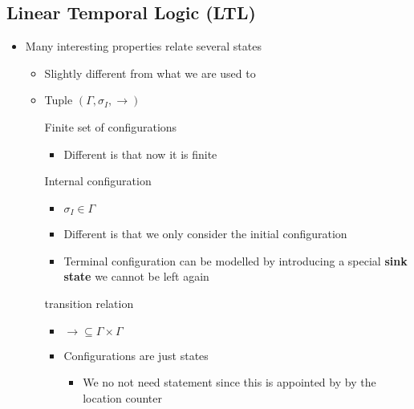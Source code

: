 \subsection{Linear Temporal Logic (LTL)}
\begin{itemize}
    \item Many interesting properties relate several states
        \begin{itemize}
            \item Slightly different from what we are used to
            \item Tuple $(\Gamma, \sigma_I, \to)$
                \begin{itemize}
                    \ides{$\mathbf{\Gamma}$:} Finite set of configurations
                        \begin{itemize}
                            \item Different is that now it is finite
                        \end{itemize}
                     Internal configuration
                        \begin{itemize}
                            \item $\sigma_I \in \Gamma$
                            \item Different is that we only consider the initial configuration
                            \item Terminal configuration can be modelled by introducing a special \textbf{sink state} we cannot be left again
                        \end{itemize}
                    \ides{$\mathbf{\to}$:} transition relation
                        \begin{itemize}
                            \item $\to \subseteq \Gamma \times \Gamma$
                        \end{itemize}
                \end{itemize}
                \begin{itemize}
                    \item Configurations are just states
                        \begin{itemize}
                            \item We no not need statement since this is appointed by by the location counter
                        \end{itemize}

\end{itemize}
\end{itemize}
\end{itemize}
